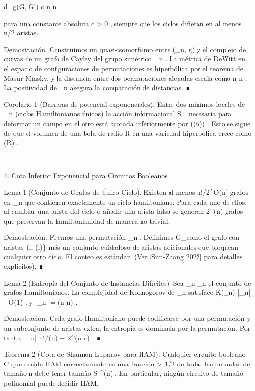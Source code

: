 \documentclass[12pt,twoside]{book}
\begin{document}
d_g(G, G') \ge c \cdot n \log n

para una constante absoluta  c > 0 , siempre que los ciclos difieran en al menos  n/2  aristas.

Demostración. Construimos un quasi‑isomorfismo entre  (_n, g)  y el complejo de curvas de un grafo de Cayley del grupo simétrico  _n . La métrica de DeWitt en el espacio de configuraciones de permutaciones es hiperbólica por el teorema de Masur‑Minsky, y la distancia entre dos permutaciones alejadas escala como  n \log n . La positividad de  \rho_n  asegura la comparación de distancias. ∎

Corolario 1 (Barreras de potencial exponenciales).
Entre dos mínimos locales de  \rho_n  (ciclos Hamiltonianos únicos) la acción informacional  S_{}  necesaria para deformar un campo en el otro está acotada inferiormente por  \exp(\Omega(n)) . Esto se sigue de que el volumen de una bola de radio  R  en una variedad hiperbólica crece como  \exp(\dim \cdot R) .

---

4. Cota Inferior Exponencial para Circuitos Booleanos

Lema 1 (Conjunto de Grafos de Único Ciclo).
Existen al menos  n!/2^{O(n)}  grafos en  _n  que contienen exactamente un ciclo hamiltoniano. Para cada uno de ellos, al cambiar una arista del ciclo o añadir una arista falsa se generan  2^{\Omega(n)}  grafos que preservan la hamiltonianidad de manera no trivial.

Demostración. Fijemos una permutación  \sigma \in {}_n . Definimos  G_\sigma  como el grafo con aristas  \{i, \sigma(i)\}  más un conjunto cuidadoso de aristas adicionales que bloquean cualquier otro ciclo. El conteo es estándar. (Ver [Sun‑Zhang 2022] para detalles explícitos). ∎

Lema 2 (Entropía del Conjunto de Instancias Difíciles).
Sea  _n \subset {}_n  el conjunto de grafos Hamiltonianos. La complejidad de Kolmogorov de  _n  satisface  K(_n) \ge \log |_n| - O(1) , y  \log |_n| = \Omega(n \log n) .

Demostración. Cada grafo Hamiltoniano puede codificarse por una permutación y un subconjunto de aristas extra; la entropía es dominada por la permutación. Por tanto,  |_n| \ge n!/(n) = 2^{\Omega(n \log n)} . ∎

Teorema 2 (Cota de Shannon‑Lupanov para HAM).
Cualquier circuito booleano  C  que decide HAM correctamente en una fracción  \delta > 1/2  de todas las entradas de tamaño  n  debe tener tamaño  S \ge \delta {}^{\Omega(n)} . En particular, ningún circuito de tamaño polinomial puede decidir HAM.
\end{document}

